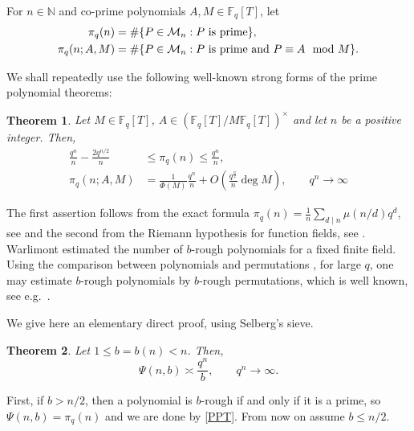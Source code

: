 \documentclass[12pt]{amsart}
\numberwithin{equation}{section}
\newtheorem{theorem}{Theorem}[section]
\theoremstyle{definition}
\theoremstyle{remark}
\newcommand{\FF}{\mathbb{F}}
\newcommand{\NN}{\mathbb{N}}
\newcommand{\ps}[1]{\left( #1 \right)}
\begin{document}
 For $n\in \NN$ and co-prime polynomials $A,M \in \FF_q[T]$, let
 \begin{align}\label{df:pi}
     \pi_q(n) &= \# \{P\in \mathcal{M}_n: P \textnormal{ is prime} \}, \\
     \pi_q(n;A,M) &= \# \{ P \in \mathcal{M}_n: P \textnormal{ is prime and } P \equiv A \mod M \}.
 \end{align}

We shall repeatedly use the following well-known strong forms of the prime polynomial theorems:


\begin{theorem} \label{th:PPTs}
    Let $M\in \mathbb{F}_q[T]$, $A \in \left(\mathbb{F}_q[T] / M \mathbb{F}_q[T]\right)^{\times}$ and let $n$  be a positive integer. Then,  
    \begin{align}
        \label{PPT}\frac{q^n}{n} - \frac{2q^{n/2}}{n} &\leq \pi_q(n) \leq \frac{q^n}{n}, \\
        \label{PPTAP}
        \pi_q(n;A,M)  &= \frac{1}{\Phi(M)}\frac{q^n}{n} + O\ps{\frac{q^{\frac{n}{2}}}{n}\deg M}, \qquad q^n \to \infty
    \end{align}
\end{theorem}

The first assertion follows from the exact formula $\pi_q(n) = \frac{1}{n} \sum_{d\mid n} \mu(n/d)q^d$, see \cite[Lemma~4]{pollack2013irreducible} and the second from the Riemann hypothesis for function fields, see \cite[Theorem 4.8]{NumberTheory_FF}.
\\

Warlimont \cite[Eq.\ 4]{Worlimont} estimated the number of $b$-rough polynomials for a fixed finite field. Using the comparison between polynomials and permutations \cite[Theorem 5.8]{ABT}, for large $q$, one may estimate $b$-rough polynomials by $b$-rough permutations, which is well known, see e.g.\ \cite{Ford_permutations}.

We give here an elementary direct proof, using Selberg's sieve.

\begin{theorem}\label{prop:Uniform Rough Polynomials}
    Let $1\leq b=b(n) < n$. Then,
    \[
    \Psi(n,b) \asymp \frac{q^n}{b}, \qquad q^n \to \infty.
    \]    

\end{theorem}

First, if $b > n/2$, then a polynomial is $b$-rough if and only if it is a prime, so $\Psi(n,b) = \pi_q(n)$ and we are done by \eqref{PPT}.
From now on assume $b\leq n/2$. 
\end{document}
